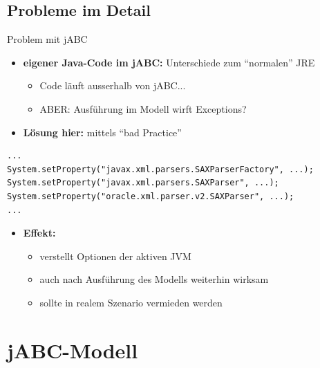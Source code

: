\subsection*{Probleme im Detail}
\begin{frame}[fragile]{Problem mit jABC}
\begin{itemize}[<+->]
	\item \textbf{eigener Java-Code im jABC:} Unterschiede zum "`normalen"' JRE
	\begin{itemize}[<+->]
			\item Code läuft ausserhalb von jABC...
			\item ABER: Ausführung im Modell wirft Exceptions?
	\end{itemize}
	\pause
	\item \textbf{Lösung hier:} mittels "`bad Practice"'
\end{itemize}
\javalstset
\begin{lstlisting}
...
System.setProperty("javax.xml.parsers.SAXParserFactory", ...);
System.setProperty("javax.xml.parsers.SAXParser", ...);
System.setProperty("oracle.xml.parser.v2.SAXParser", ...);
...
\end{lstlisting}
\begin{itemize}[<+->]
	\item \textbf{Effekt:}
		\begin{itemize}[<+->]
			\item verstellt Optionen der aktiven JVM
			\item auch nach Ausführung des Modells weiterhin wirksam
			\item sollte in realem Szenario vermieden werden
		\end{itemize}
\end{itemize}
\end{frame}


\section{jABC-Modell}


